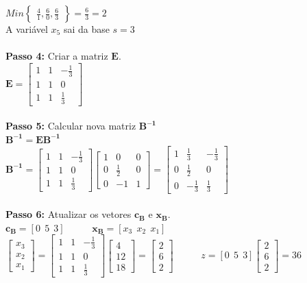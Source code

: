 {\begin{minipage}[l]{14,2cm}
$Min\begin{Bmatrix}
\frac{4}{1},\frac{6}{0},\frac{6}{3}
\end{Bmatrix} = \frac{6}{3} = 2$\\
A variável $x_{5}$ sai da base $s=3$
\\ \\
\textbf{Passo 4:} Criar a matriz $\mathbf{E}$.
\\$\mathbf{E}=\begin{bmatrix}
1 & 1 & -\frac{1}{3}\\
1 & 1 & 0\\
1 & 1 & \frac{1}{3}
\end{bmatrix}$
\\ \\
\textbf{Passo 5:} Calcular nova matriz $\mathbf{B^{-1}}$ 
\\$\mathbf{B^{-1}} = \mathbf{EB^{-1}}$
\\$\mathbf{B^{-1}} = \begin{bmatrix}
1 & 1 & -\frac{1}{3}\\
1 & 1 & 0\\
1 & 1 & \frac{1}{3}
\end{bmatrix}\begin{bmatrix}
1 & 0 & 0 \\
0 & \frac{1}{2} & 0 \\
0 & -1 & 1
\end{bmatrix}=\begin{bmatrix}
1 & \frac{1}{3} & -\frac{1}{3} \\
0 & \frac{1}{2} & 0 \\
0 & -\frac{1}{3} & \frac{1}{3}
\end{bmatrix}$
\\ \\
\textbf{Passo 6:} Atualizar os vetores $\mathbf{c{_B}}$ e $\mathbf{x{_B}}$.
\\$\mathbf{c{_B}}=[0\ \ 5\ \ 3]$
 \ \ \ \ \ $\mathbf{x{_B}}=[x{_3}\ \ x{_2}\ \ x{_1}]$
\\$\begin{bmatrix}
x{_3} \\
x{_2} \\
x{_1} 
\end{bmatrix} = \begin{bmatrix}
1 & 1 & -\frac{1}{3}\\
1 & 1 & 0\\
1 & 1 & \frac{1}{3}
\end{bmatrix}\begin{bmatrix}
4 \\
12 \\
18 
\end{bmatrix} = \begin{bmatrix}
2 \\
6 \\
2 
\end{bmatrix}$
 \ \ \ \ \ $z = [0\ \ 5\ \ 3]\begin{bmatrix}
2 \\
6 \\
2 
\end{bmatrix} = 36$
\end{minipage}
}

